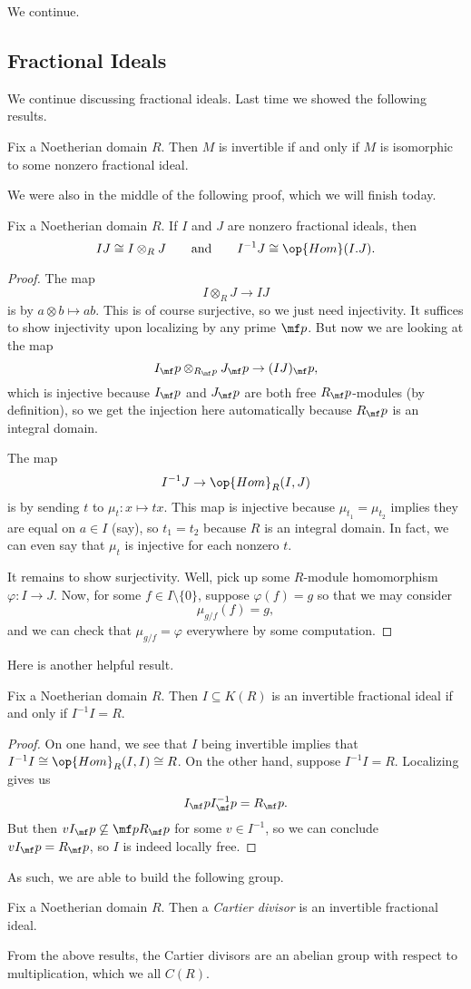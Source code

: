 \documentclass[../notes.tex]{subfiles}
\begin{document}

We continue.

\subsection{Fractional Ideals}
We continue discussing fractional ideals. Last time we showed the following results.
\begin{lemma} \label{lem:classifyinvertiblemods}
	Fix a Noetherian domain $R$. Then $M$ is invertible if and only if $M$ is isomorphic to some nonzero fractional ideal.
\end{lemma}
We were also in the middle of the following proof, which we will finish today.
\begin{lemma}
	Fix a Noetherian domain $R$. If $I$ and $J$ are nonzero fractional ideals, then
	\[IJ\cong I\otimes_RJ\qquad\text{and}\qquad I^{-1}J\cong\op{Hom}(I.J).\]
\end{lemma}
\begin{proof}
	The map
	\[I\otimes_RJ\to IJ\]
	is by $a\otimes b\mapsto ab$. This is of course surjective, so we just need injectivity. It suffices to show injectivity upon localizing by any prime $\mf p$. But now we are looking at the map
	\[I_\mf p\otimes_{R_\mf p}J_\mf p\to(IJ)_\mf p,\]
	which is injective because $I_\mf p$ and $J_\mf p$ are both free $R_\mf p$-modules (by definition), so we get the injection here automatically because $R_\mf p$ is an integral domain.

	The map
	\[I^{-1}J\to\op{Hom}_R(I,J)\]
	is by sending $t$ to $\mu_t:x\mapsto tx$. This map is injective because $\mu_{t_1}=\mu_{t_2}$ implies they are equal on $a\in I$ (say), so $t_1=t_2$ because $R$ is an integral domain. In fact, we can even say that $\mu_t$ is injective for each nonzero $t$.

	It remains to show surjectivity. Well, pick up some $R$-module homomorphism $\varphi:I\to J$. Now, for some $f\in I\setminus\{0\}$, suppose $\varphi(f)=g$ so that we may consider
	\[\mu_{g/f}(f)=g,\]
	and we can check that $\mu_{g/f}=\varphi$ everywhere by some computation.
\end{proof}
Here is another helpful result.
\begin{lemma}
	Fix a Noetherian domain $R$. Then $I\subseteq K(R)$ is an invertible fractional ideal if and only if $I^{-1}I=R$.
\end{lemma}
\begin{proof}
	On one hand, we see that $I$ being invertible implies that $I^{-1}I\cong\op{Hom}_R(I,I)\cong R$. On the other hand, suppose $I^{-1}I=R$. Localizing gives us
	\[I_\mf pI^{-1}_\mf p=R_\mf p.\]
	But then $vI_\mf p\not\subseteq\mf pR_\mf p$ for some $v\in I^{-1}$, so we can conclude $vI_\mf p=R_\mf p$, so $I$ is indeed locally free.
\end{proof}
As such, we are able to build the following group.
\begin{definition}
	Fix a Noetherian domain $R$. Then a \textit{Cartier divisor} is an invertible fractional ideal.
\end{definition}
From the above results, the Cartier divisors are an abelian group with respect to multiplication, which we all $C(R)$.
\end{document}
